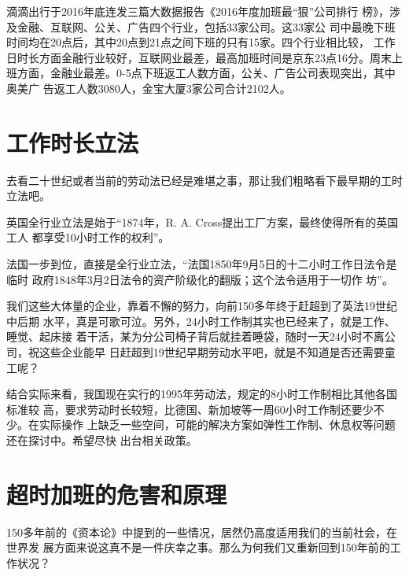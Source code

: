 滴滴出行于2016年底连发三篇大数据报告《2016年度加班最“狠”公司排行
榜》\cite{zuihen}，涉及金融、互联网、公关、广告四个行业，包括33家公司。这33家公
司中最晚下班时间均在20点后，其中20点到21点之间下班的只有15家。四个行业相比较，
工作日时长方面金融行业较好，互联网业最差，最高加班时间是京东23点16分。周末上
班方面，金融业最差。0-5点下班返工人数方面，公关、广告公司表现突出，其中奥美广
告返工人数3080人，金宝大厦3家公司合计2102人。

\section{工作时长立法}

去看二十世纪或者当前的劳动法已经是难堪之事，那让我们粗略看下最早期的工时立法吧。

英国全行业立法是始于“1874年，R. A. Cross提出工厂方案，最终使得所有的英国工人
都享受10小时工作的权利”\cite[96]{britishworkday}。

法国一步到位，直接是全行业立法，“法国1850年9月5日的十二小时工作日法令是临时
政府1848年3月2日法令的资产阶级化的翻版；这个法令适用于一切作
坊”\cite[319]{capital}。

我们这些大体量的企业，靠着不懈的努力，向前150多年终于赶超到了英法19世纪中后期
水平，真是可歌可泣。另外，24小时工作制其实也已经来了，就是工作、睡觉、起床接
着干活，某为分公司椅子背后就挂着睡袋，随时一天24小时不离公司，祝这些企业能早
日赶超到19世纪早期劳动水平吧，就是不知道是否还需要童工呢？

结合实际来看，我国现在实行的1995年劳动法，规定的8小时工作制相比其他各国标准较
高，要求劳动时长较短，比德国、新加坡等一周60小时工作制还要少不少。在实际操作
上缺乏一些空间，可能的解决方案如弹性工作制、休息权等问题还在探讨中。希望尽快
出台相关政策。

\section{超时加班的危害和原理}
\label{sec:gzryuanli}

150多年前的《资本论》中提到的一些情况，居然仍高度适用我们的当前社会，在世界发
展方面来说这真不是一件庆幸之事。那么为何我们又重新回到150年前的工作状况？

